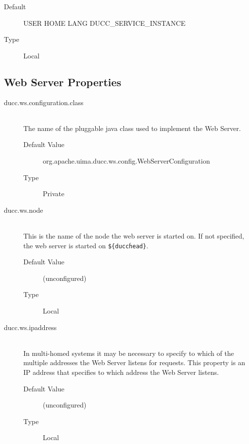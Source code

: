 \begin{description}
         \begin{description}
           \item[Default] USER HOME LANG DUCC\_SERVICE\_INSTANCE
           \item[Type] Local 
         \end{description}
                                                                        
      \end{description}  
        

\subsection{Web Server Properties}

    \begin{description}
        \item[ducc.ws.configuration.class] \hfill \\
          The name of the pluggable java class used to implement the Web Server. 
          \begin{description}
            \item[Default Value] org.apache.uima.ducc.ws.config.WebServerConfiguration 
            \item[Type] Private 
          \end{description}
        
        \item[ducc.ws.node] \hfill \\
          This is the name of the node the web server is started on. If not specified, the web server is 
          started on {\tt \$\{ducc\.head\}}.
          \begin{description}
            \item[Default Value] (unconfigured) 
            \item[Type] Local 
          \end{description}
            

        \item[ducc.ws.ipaddress] \hfill \\
          In multi-homed systems it may be necessary to specify to which of the multiple addresses 
          the Web Server listens for requests. This property is an IP address that specifies to which 
          address the Web Server listens. 
          \begin{description}
            \item[Default Value] (unconfigured) 
            \item[Type] Local 
          \end{description}
              

\end{description}
